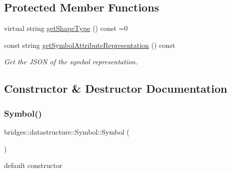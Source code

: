\subsection*{Protected Member Functions}
\begin{DoxyCompactItemize}
\item 
virtual string \hyperlink{classbridges_1_1datastructure_1_1_symbol_a1fb7cabce2915b103b8474658e8549f8}{get\+Shape\+Type} () const =0
\item 
const string \hyperlink{classbridges_1_1datastructure_1_1_symbol_ab9a92e73867a95e8cc3e63cad75d266a}{get\+Symbol\+Attribute\+Representation} () const
\begin{DoxyCompactList}\small\item\em Get the J\+S\+ON of the symbol representation. \end{DoxyCompactList}\end{DoxyCompactItemize}


\subsection{Constructor \& Destructor Documentation}
\mbox{\label{classbridges_1_1datastructure_1_1_symbol_a6169106c021d20752abba3cd266ecfb0}} 
\subsubsection{\texorpdfstring{Symbol()}{Symbol()}\hspace{0.1cm}{\footnotesize\ttfamily [1/2]}}
{\footnotesize\ttfamily bridges\+::datastructure\+::\+Symbol\+::\+Symbol (\begin{DoxyParamCaption}{ }\end{DoxyParamCaption})\hspace{0.3cm}{\ttfamily [inline]}}



default constructor 

\mbox{\label{classbridges_1_1datastructure_1_1_symbol_ab19c9471100339ca240db841a21b800c}} 

